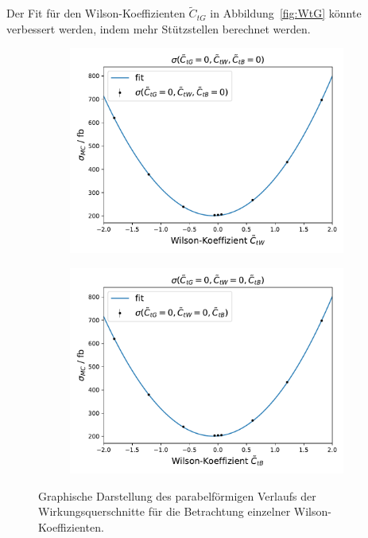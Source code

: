 Der Fit für den Wilson-Koeffizienten $\tilde{C}_{tG}$ in Abbildung~\ref{fig:WtG} könnte verbessert werden, indem mehr Stützstellen berechnet werden.\\
\begin{figure}
  \begin{subfigure}[c]{0.5\textwidth}
    \centering
    \includegraphics[width=\textwidth]{Plots/combi_plot_tW.pdf}
    \label{fig:WtW}
  \end{subfigure}
  \begin{subfigure}[c]{0.5\textwidth}
    \centering
    \includegraphics[width=\textwidth]{Plots/combi_plot_tB.pdf}
    \label{fig:WtB}
  \end{subfigure}
  \caption{Graphische Darstellung des parabelförmigen Verlaufs der Wirkungsquerschnitte für die Betrachtung einzelner Wilson-Koeffizienten.}
  \label{fig:tp}
\end{figure}
